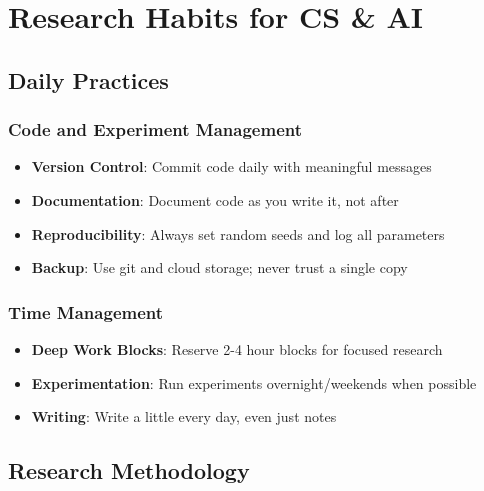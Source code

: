 \documentclass[11pt,a4paper]{article}
\begin{document}
\section{Research Habits for CS \& AI}

\subsection{Daily Practices}

\subsubsection{Code and Experiment Management}
\begin{itemize}
    \item \textbf{Version Control}: Commit code daily with meaningful messages
    \item \textbf{Documentation}: Document code as you write it, not after
    \item \textbf{Reproducibility}: Always set random seeds and log all parameters
    \item \textbf{Backup}: Use git and cloud storage; never trust a single copy
\end{itemize}

\subsubsection{Time Management}
\begin{itemize}
    \item \textbf{Deep Work Blocks}: Reserve 2-4 hour blocks for focused research
    \item \textbf{Experimentation}: Run experiments overnight/weekends when possible
    \item \textbf{Writing}: Write a little every day, even just notes
\end{itemize}

\subsection{Research Methodology}
\end{document}
